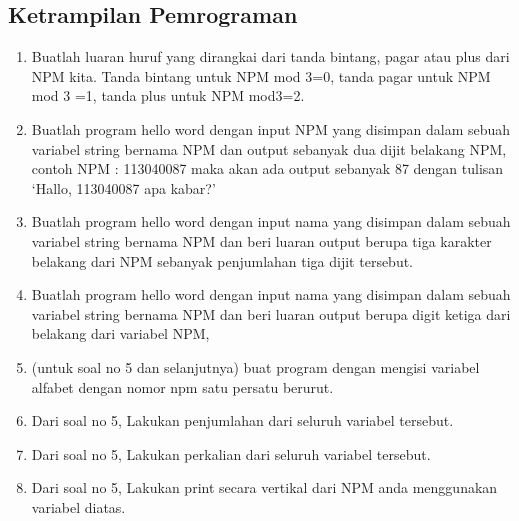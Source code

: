 \subsection{Ketrampilan Pemrograman}
\begin{enumerate}
    \item Buatlah luaran huruf yang dirangkai dari tanda bintang, pagar atau plus dari NPM kita. Tanda 		    bintang untuk NPM mod 3=0, tanda pagar untuk NPM mod 3 =1, tanda plus untuk NPM mod3=2.
    

    \item  Buatlah program hello word dengan input NPM yang disimpan dalam sebuah variabel string bernama      	NPM dan output sebanyak dua dijit belakang NPM, contoh NPM : 113040087 maka akan ada output sebanyak 		87 dengan tulisan ‘Hallo, 113040087 apa kabar?’
    
    
    \item Buatlah program hello word dengan input nama yang disimpan dalam sebuah
    variabel string bernama NPM dan beri luaran output berupa tiga karakter
    belakang dari NPM sebanyak penjumlahan tiga dijit tersebut.
    

    \item Buatlah program hello word dengan input nama yang disimpan dalam sebuah variabel string bernama 	NPM dan beri luaran output berupa digit ketiga dari belakang dari variabel NPM,
    
    
    \item  (untuk soal no 5 dan selanjutnya) buat program dengan mengisi variabel alfabet dengan nomor 			npm satu persatu berurut. 
    

    \item Dari soal no 5, Lakukan penjumlahan dari seluruh variabel tersebut.
    

    \item Dari soal no 5, Lakukan perkalian dari seluruh variabel tersebut.
    

    \item Dari soal no 5, Lakukan print secara vertikal dari NPM anda menggunakan
    variabel diatas.
    


\end{enumerate}
